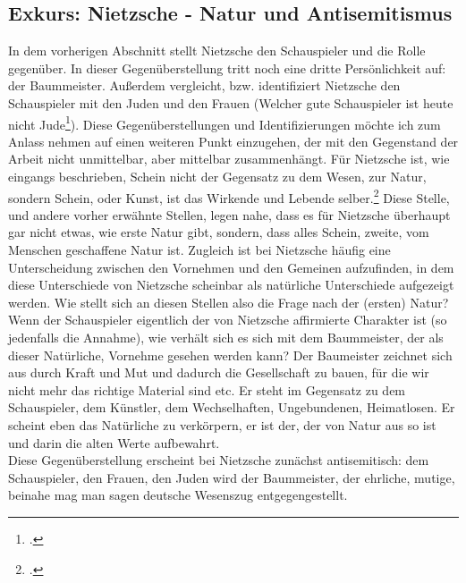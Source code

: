 \documentclass[12pt, a4paper, openany]{report}
\begin{document}
\subsection{Exkurs: Nietzsche - Natur und Antisemitismus}
In dem vorherigen Abschnitt stellt Nietzsche den Schauspieler und die Rolle gegenüber. 
In dieser Gegenüberstellung tritt noch eine dritte \glqq Persönlichkeit\grqq{} auf: der Baummeister. 
Außerdem vergleicht, bzw. identifiziert Nietzsche den Schauspieler mit den Juden und den Frauen (\glqq Welcher gute Schauspieler ist heute nicht Jude\grqq\footcite[][608]{nietzsche_morgenrote_1999}).
Diese Gegenüberstellungen und Identifizierungen möchte ich zum Anlass nehmen auf einen weiteren Punkt einzugehen, der mit den Gegenstand der Arbeit nicht unmittelbar, aber mittelbar zusammenhängt. 
Für Nietzsche ist, wie eingangs beschrieben, Schein nicht der Gegensatz zu dem Wesen, zur Natur, sondern Schein, oder Kunst, ist das Wirkende und Lebende selber.\footcite[Vgl.][416]{nietzsche_morgenrote_1999} 
Diese Stelle, und andere vorher erwähnte Stellen, legen nahe, dass es für Nietzsche überhaupt gar nicht etwas, wie erste Natur gibt, sondern, dass alles Schein, zweite, vom Menschen geschaffene Natur ist.
Zugleich ist bei Nietzsche häufig eine Unterscheidung zwischen den \glqq Vornehmen\grqq{} und den \glqq Gemeinen\grqq{} aufzufinden, in dem diese Unterschiede von Nietzsche scheinbar als natürliche Unterschiede aufgezeigt werden. 
Wie stellt sich an diesen Stellen also die Frage nach der (ersten) Natur?
Wenn der Schauspieler eigentlich der von Nietzsche affirmierte Charakter ist (so jedenfalls die Annahme), wie verhält sich es sich mit dem Baummeister, der als dieser Natürliche, Vornehme gesehen werden kann? 
Der Baumeister zeichnet sich aus durch Kraft und Mut und dadurch die Gesellschaft zu bauen, für die \glqq wir\grqq{} nicht mehr das richtige Material sind etc. 
Er steht im Gegensatz zu dem Schauspieler, dem Künstler, dem Wechselhaften, Ungebundenen, Heimatlosen. 
Er scheint eben das Natürliche zu verkörpern, er ist der, der \glqq von Natur aus\grqq{} so ist und darin die alten Werte aufbewahrt.\\
Diese Gegenüberstellung erscheint bei Nietzsche zunächst antisemitisch:
dem Schauspieler, den Frauen, den Juden wird der Baummeister, der ehrliche, mutige, beinahe mag man sagen \glqq deutsche\grqq{} Wesenszug entgegengestellt.
\end{document}
